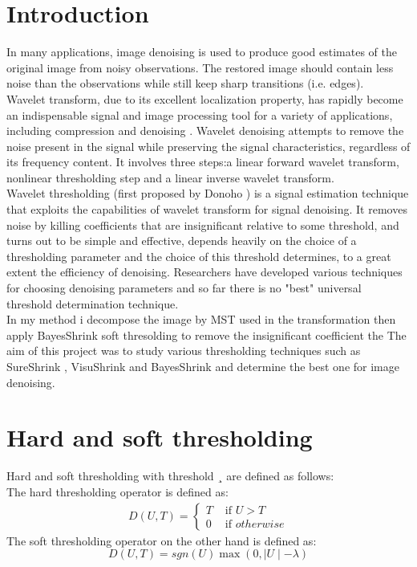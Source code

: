 \section{Introduction}
In many applications, image denoising is used to produce good estimates of the original image from noisy observations.   The restored image should contain less noise than the observations while still keep sharp transitions (i.e. edges). \\


Wavelet transform, due to its excellent localization property, has rapidly become an indispensable signal and image processing tool for a variety of applications, including 
compression and denoising \cite{21,22,23}.   Wavelet denoising attempts to remove the noise present in the signal while preserving the signal characteristics, regardless of its 
frequency content.   It involves three steps:a linear forward wavelet transform, nonlinear  thresholding step and a linear inverse wavelet transform.\\

Wavelet thresholding (first proposed by Donoho \cite{21,22,23}) is a signal estimation technique that exploits the capabilities of wavelet transform for signal denoising.   It removes noise  by killing coefficients that are insignificant relative to some threshold, and turns out to be simple and effective, depends heavily on the choice of a thresholding parameter and the choice of this threshold determines, to a great extent the efficiency of denoising. Researchers have developed various techniques for choosing denoising parameters and so far there is no "best" universal threshold determination technique. \\

In my method i decompose the image by MST used in the transformation then apply BayesShrink soft thresolding to remove the insignificant coefficient the The aim of this project was to study various thresholding techniques such as  SureShrink \cite{21}, VisuShrink \cite{23} and BayesShrink \cite{22} and determine the best one for image 
denoising.

\section{Hard and soft thresholding}

Hard and soft thresholding with threshold ¸ are defined as follows: \\
The hard thresholding operator is defined as:
\begin{equation}
    \begin{split}
  D(U,T)=
\begin{cases}
 T& \text{ if } U>T \\
 0 &\text{ if } otherwise  
\end{cases}
    \end{split}
\end{equation}
The soft thresholding operator on the other hand is defined as:
\begin{equation}
D(U,T)=sgn\left(U \right)\max \left(0,\mid U \mid-\lambda  \right)
\end{equation}


